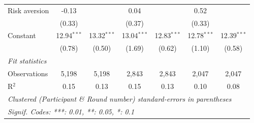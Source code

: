 \begin{table}[htbp]
\begin{tabular}{lcccccc}
      Risk aversion                     & -0.13         &               & 0.04          &               & 0.52          &   \\   
                                        & (0.33)        &               & (0.37)        &               & (0.33)        &   \\   
      Constant                          & 12.94$^{***}$ & 13.32$^{***}$ & 13.04$^{***}$ & 12.83$^{***}$ & 12.78$^{***}$ & 12.39$^{***}$\\   
                                        & (0.78)        & (0.50)        & (1.69)        & (0.62)        & (1.10)        & (0.58)\\   
      \midrule
      \emph{Fit statistics}\\
      Observations                      & 5,198         & 5,198         & 2,843         & 2,843         & 2,047         & 2,047\\  
      R$^2$                             & 0.15          & 0.13          & 0.15          & 0.13          & 0.10          & 0.08\\  
      \midrule \midrule
      \multicolumn{7}{l}{\emph{Clustered (Participant \& Round number) standard-errors in parentheses}}\\
      \multicolumn{7}{l}{\emph{Signif. Codes: ***: 0.01, **: 0.05, *: 0.1}}\\
   \end{tabular}
\end{table}

